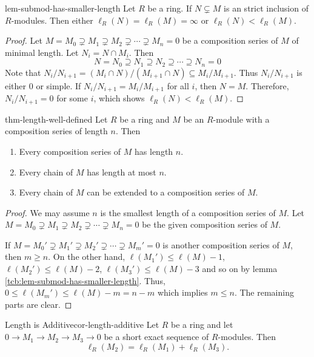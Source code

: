 \documentclass[a4paper,10pt]{article}
\theoremstyle{definition}
\newcommand\lref[2][blue!60!black]{lemma \ref{tcb:#2}}
\renewcommand\leq{\leqslant}
\renewcommand\geq{\geqslant}
\begin{document}
\begin{lemma}{}{lem-submod-has-smaller-length}
Let $R$ be a ring.
If $N\subsetneq M$ is an strict inclusion of $R$-modules.
Then either $\ell_R(N)=\ell_R(M)=\infty$ or 
$\ell_R(N)<\ell_R(M)$.
\end{lemma}
\begin{proof}
Let $M=M_0\supsetneq M_1\supsetneq M_2\supsetneq\cdots\supsetneq M_n=0$ 
be a composition series of $M$ of minimal length.
Let $N_i=N\cap M_i$.
Then 
\begin{equation*}
N=N_0\supseteq N_1\supseteq N_2\supseteq\cdots\supseteq N_n=0
\end{equation*}
Note that $N_i/N_{i+1}=(M_i\cap N)/(M_{i+1}\cap N)\subseteq M_i/M_{i+1}$.
Thus $N_i/N_{i+1}$ is either $0$ or simple. 
If $N_i/N_{i+1}=M_i/M_{i+1}$ for all $i$, then $N=M$.
Therefore, $N_i/N_{i+1}=0$ for some $i$, 
which shows $\ell_R(N)<\ell_R(M)$.
\end{proof}

\begin{theorem}{}{thm-length-well-defined}
Let $R$ be a ring and $M$ be an $R$-module 
with a composition series of length $n$.
Then 
\begin{enumerate}[label=(\arabic*)]
\item
Every composition series of $M$ has length $n$.
\item
Every chain of $M$ has length at most $n$.
\item 
Every chain of $M$ can be extended to a composition series of $M$.
\end{enumerate}
\end{theorem}
\begin{proof}
We may assume $n$ is the smallest length of a composition series of $M$.
Let $M=M_0\supsetneq$$M_1\supsetneq M_2\supsetneq\cdots\supsetneq M_n=0$ 
be the given composition series of $M$.

If $M=M_0'\supsetneq M_1'\supsetneq M_2'\supsetneq\cdots\supsetneq M_m'=0$ 
is another composition series of $M$, then $m\geq n$.
On the other hand, $\ell(M_1')\leq\ell(M)-1$, $\ell(M_2')\leq\ell(M)-2$, 
$\ell(M_3')\leq\ell(M)-3$ and so on by \lref{lem-submod-has-smaller-length}.
Thus, $0\leq\ell(M_m')\leq\ell(M)-m=n-m$ which implies $m\leq n$.
The remaining parts are clear.
\end{proof}

\begin{corollary}{Length is Additive}{cor-length-additive}
Let $R$ be a ring and let $0\to M_1\to M_2\to M_3\to0$ 
be a short exact sequence of $R$-modules.
Then 
\begin{equation*}
\ell_R(M_2)=\ell_R(M_1)+\ell_R(M_3).
\end{equation*}
\end{corollary}
\end{document}
